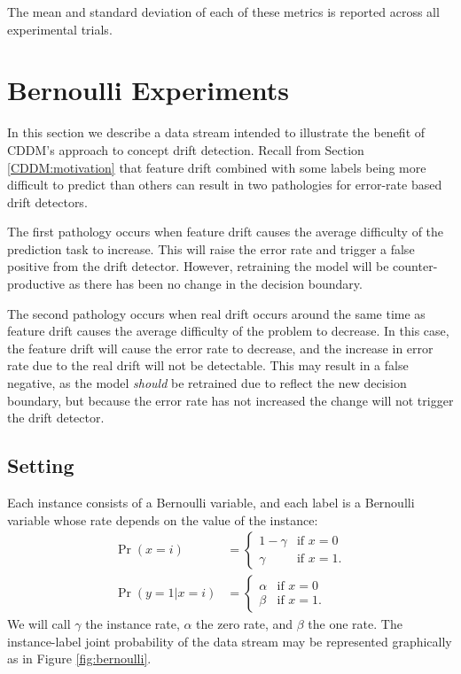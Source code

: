 The mean and standard deviation of each of these metrics is reported across all experimental trials. 


\section{Bernoulli Experiments} \label{Experiments:bernoulli}

In this section we describe a data stream intended to illustrate the benefit of CDDM's approach to concept drift detection. Recall from Section \ref{CDDM:motivation} that feature drift combined with some labels being more difficult to predict than others can result in two pathologies for error-rate based drift detectors. 

The first pathology occurs when feature drift causes the average difficulty of the prediction task to increase. This will raise the error rate and trigger a false positive from the drift detector. However, retraining the model will be counter-productive as there has been no change in the decision boundary.

The second pathology occurs when real drift occurs around the same time as feature drift causes the average difficulty of the problem to decrease. In this case, the feature drift will cause the error rate to decrease, and the increase in error rate due to the real drift will not be detectable. This may result in a false negative, as the model {\it should} be retrained due to reflect the new decision boundary, but because the error rate has not increased the change will not trigger the drift detector.

\subsection{Setting}

Each instance consists of a Bernoulli variable, and each label is a Bernoulli variable whose rate depends on the value of the instance:
\begin{align}
  \Pr(x=i) &= \begin{cases}
    1-\gamma & \text{if }x=0 \\
    \gamma & \text{if }x=1.
    \end{cases} \\
  \Pr(y=1|x=i) &= \begin{cases}
    \alpha & \text{if }x=0 \\
    \beta & \text{if }x=1.
    \end{cases}
\end{align}
We will call $\gamma$ the instance rate, $\alpha$ the zero rate, and $\beta$ the one rate. The instance-label joint probability of the data stream may be represented graphically as in Figure \ref{fig:bernoulli}.

